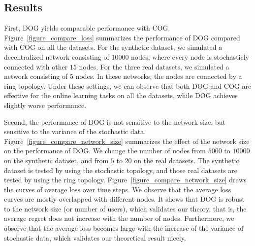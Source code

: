 \documentclass{article}
\begin{document}
\subsection{Results}

First, DOG yields comparable performance with COG. Figure~\ref{figure_compare_loss} summarizes the performance of DOG compared with COG on all the datasets. 
For the synthetic dataset, we simulated a decentralized network consisting of $10000$ nodes, where every node is stochasticly connected with other $15$ nodes.
For the three real datasets, we simulated a network consisting of $5$ nodes. 
In these networks, the nodes are connected by a ring topology. 
Under these settings, we can observe that both DOG and COG are effective for the online learning tasks on all the datasets, while DOG achieves slightly worse performance. 


Second, the performance of DOG is not sensitive to the network size, but sensitive to the variance of the stochastic data. Figure~\ref{figure_compare_network_size} summarizes the effect of the network size on the performance of DOG. We change the number of nodes from $5000$ to $10000$ on the synthetic dataset, and from $5$ to $20$ on the real datasets. The synthetic dataset is tested by using the stochastic topology, and those real datasets are tested by using the ring topology. Figure~\ref{figure_compare_network_size} draws the curves of average loss over time steps. We observe that the average loss curves are mostly overlapped with different nodes. It shows that DOG is robust to the network size (or number of users), which validates our theory, that is, the average regret does not increase with the number of nodes. Furthermore, we observe that the average loss becomes large with the increase of the variance of stochastic data, which validates our theoretical result nicely.  
\end{document}
